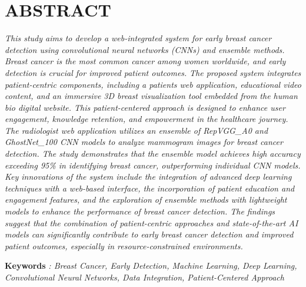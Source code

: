 \documentclass[12pt, twoside]{report}
\begin{document}
	\chapter*{ABSTRACT}
	\textit{This study aims to develop a web-integrated system for early breast cancer detection using convolutional neural networks (CNNs) and ensemble methods. Breast cancer is the most common cancer among women worldwide, and early detection is crucial for improved patient outcomes. }
	\textit{The proposed system integrates patient-centric components, including a patients web application, educational video content, and an immersive 3D breast visualization tool embedded from the human bio digital website. This patient-centered approach is designed to enhance user engagement, knowledge retention, and empowerment in the healthcare journey.}
	\textit{The radiologist web application utilizes an ensemble of RepVGG\_A0 and GhostNet\_100 CNN models to analyze mammogram images for breast cancer detection. The study demonstrates that the ensemble model achieves high accuracy exceeding 95\% in identifying breast cancer, outperforming individual CNN models.}
	\textit{Key innovations of the system include the integration of advanced deep learning techniques with a web-based interface, the incorporation of patient education and engagement features, and the exploration of ensemble methods with lightweight models to enhance the performance of breast cancer detection. The findings suggest that the combination of patient-centric approaches and state-of-the-art AI models can significantly contribute to early breast cancer detection and improved patient outcomes, especially in resource-constrained environments.}
	
	\textbf{Keywords}
	\textit{: Breast Cancer, Early Detection, Machine Learning, Deep Learning, Convolutional Neural Networks, Data Integration, Patient-Centered Approach}
	
\end{document}
